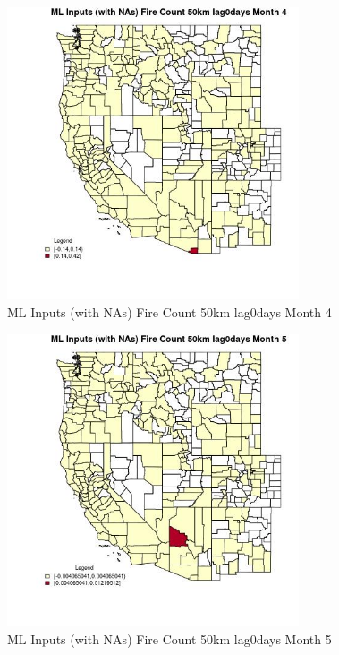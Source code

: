 \begin{figure} 
\centering  
\includegraphics[width=0.77\textwidth]{Code_Outputs/Report_ML_input_PM25_Step4_part_e_de_duplicated_aves_compiled_2019-05-21wNAs_CountyFire_Count_50km_lag0daysmedianMonth4.jpg} 
\caption{\label{fig:Report_ML_input_PM25_Step4_part_e_de_duplicated_aves_compiled_2019-05-21wNAsCountyFire_Count_50km_lag0daysmedianMonth4}ML Inputs (with NAs) Fire Count 50km lag0days Month 4} 
\end{figure} 
 

\begin{figure} 
\centering  
\includegraphics[width=0.77\textwidth]{Code_Outputs/Report_ML_input_PM25_Step4_part_e_de_duplicated_aves_compiled_2019-05-21wNAs_CountyFire_Count_50km_lag0daysmedianMonth5.jpg} 
\caption{\label{fig:Report_ML_input_PM25_Step4_part_e_de_duplicated_aves_compiled_2019-05-21wNAsCountyFire_Count_50km_lag0daysmedianMonth5}ML Inputs (with NAs) Fire Count 50km lag0days Month 5} 
\end{figure} 
 

